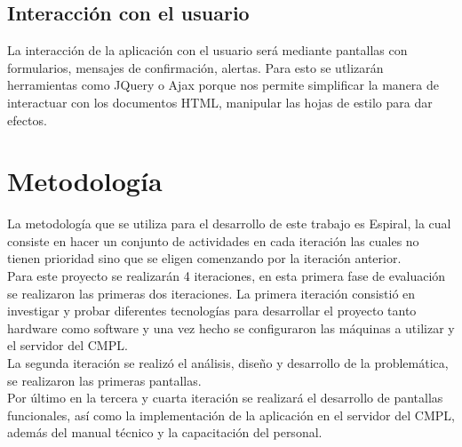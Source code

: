 \subsection{Interacción con el usuario}

La interacción de la aplicación con el usuario será mediante pantallas con formularios, mensajes de confirmación, alertas. Para esto se utlizarán herramientas como JQuery o Ajax porque nos permite simplificar la manera de interactuar con los documentos HTML, manipular las hojas de estilo para dar efectos.

\section{Metodología}

La metodología que se utiliza para el desarrollo de este trabajo es Espiral, la cual consiste en hacer un conjunto de actividades en cada iteración las cuales no tienen prioridad sino que se eligen comenzando por la iteración anterior.\\

Para este proyecto se realizarán 4 iteraciones, en esta primera fase de evaluación se realizaron las primeras dos iteraciones. La primera iteración consistió en investigar y probar  diferentes tecnologías para desarrollar el proyecto tanto hardware como software y una vez hecho se configuraron las máquinas a utilizar y el servidor del CMPL. \\
La segunda iteración se realizó el análisis, diseño y desarrollo de la problemática, se realizaron las primeras pantallas.\\

Por último en la tercera y cuarta iteración se realizará el desarrollo de pantallas funcionales, así como la implementación de la aplicación en el servidor del CMPL, además del manual técnico y la capacitación del personal. \\ 

